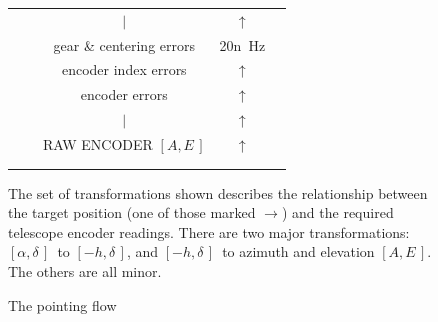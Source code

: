 \documentclass[twoside,11pt]{starlink}
\providecommand{\radec}{$[\alpha,\delta\,]$}
\providecommand{\mhadec}{$[-h,\delta\,]$}
\providecommand{\azel}{$[A,E\,]$}
\begin{document}
\begin{terminalv}
\begin{figure}
\begin{small}
\begin{center}
\begin{tabular}{|ccccc|}
        &                 &               $|$              &   $\uparrow$   & \\
        &                 &    gear \& centering errors    &      20n~Hz    & \\
        &                 &      encoder index errors      &   $\uparrow$   & \\
        &                 &         encoder errors         &   $\uparrow$   & \\
        &                 &               $|$              &   $\uparrow$   & \\
        &                 &       RAW ENCODER \azel        &   $\uparrow$   & \\
        &                 &                                &                & \\
        &                 &                                &                & \\
                                                                      \hline
      \end{tabular}
    \end{center}
  \end{small}
  \caption{The pointing flow}
  The set of transformations shown describes the relationship between the target
  position (one of those marked $\rightarrow$) and the required telescope encoder
  readings.  There are two major transformations: \radec\ to \mhadec, and \mhadec\
  to azimuth and elevation \azel.  The others are all minor.
\end{figure}

\end{terminalv}

\normalsize

\newpage
\end{document}
